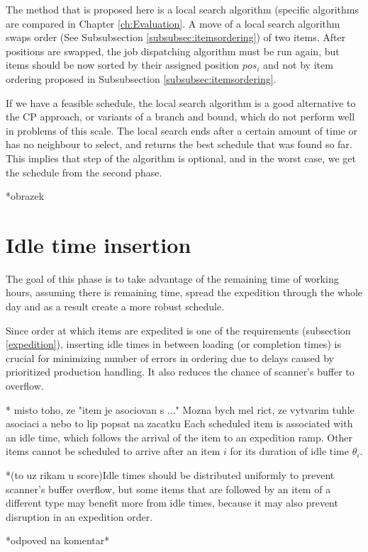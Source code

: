\documentclass{ctuthesis}
\begin{document}
The method that is proposed here is a local search algorithm (specific algorithms are compared in Chapter \ref{ch:Evaluation}. A move of a local search algorithm swaps order (See Subsubsection \ref{subsubsec:itemsordering}) of two items. After positions are swapped, the job dispatching algorithm must be run again, but items should be now sorted by their assigned position $pos_i$ and not by item ordering proposed in Subsubsection \ref{subsubsec:itemsordering}.

If we have a feasible schedule, the local search algorithm is a good alternative to the CP approach, or variants of a branch and bound, which do not perform well in problems of this scale. The local search ends after a certain amount of time or has no neighbour to select, and returns the best schedule that was found so far. This implies that step of the algorithm is optional, and in the worst case, we get the schedule from the second phase.

*obrazek

\section{Idle time insertion}

The goal of this phase is to take advantage of the remaining time of working hours, assuming there is remaining time, spread the expedition through the whole day and as a result create a more robust schedule. 

Since order at which items are expedited is one of the requirements (subsection \ref{expedition}), inserting idle times in between loading (or completion times) is crucial for minimizing number of errors in ordering due to delays caused by prioritized production handling. It also reduces the chance of scanner's buffer to overflow.


* misto toho, ze "item je asociovan s ..." Mozna bych mel rict, ze vytvarim tuhle asociaci a nebo to lip popsat na zacatku
Each scheduled item is associated with an idle time, which follows the arrival of the item to an expedition ramp. Other items cannot be scheduled to arrive after an item $i$ for its duration of idle time $\theta_i$.

*(to uz rikam u score)Idle times should be distributed uniformly to prevent scanner's buffer overflow, but some items that are followed by an item of a different type may benefit more from idle times, because it may also prevent disruption in an expedition order.

*odpoved na komentar*
\end{document}
